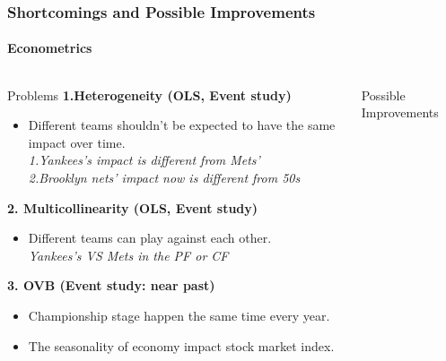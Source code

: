 \documentclass[]{beamer}
\begin{document}
\begin{frame}
        \frametitle{Shortcomings and Possible Improvements }
        \framesubtitle{Econometrics}
        \begin{columns}
            \begin{block}{\small{Problems}}
                \small \textbf{\alert{1.}Heterogeneity \tiny{(OLS, Event study)}} \vskip -0.1cm 
                    \begin{itemize}
                     \scriptsize
                    \item Different teams shouldn't be expected to have the same impact over time.\\ \vskip 0.03cm
                    \tiny{\textit{1.Yankees's impact is different from Mets'\\ \vskip 0.03cm
                                  2.Brooklyn nets' impact now is different from 50s}}
                    \end{itemize}
                    
                \small \textbf{\alert{2.} Multicollinearity \tiny{(OLS, Event study)}}\vskip -0.1cm 
                    \begin{itemize}
                     \scriptsize
                    \item Different teams can play against each other.\\ \vskip 0.03cm
                    \tiny{\textit{Yankees's VS Mets in the PF or CF}}
                    \end{itemize}

                \small \textbf{\alert{3}. OVB \tiny{(Event study: near past)}} \vskip -0.1cm 
                    \begin{itemize}
                     \scriptsize
                    \item Championship stage happen the same time every year.     \vskip -0.3cm  
                    \item The seasonality of economy impact stock market index.
                    \end{itemize}

            \end{block}

 
      \vskip 0.5cm
      \big\Rightarrow

      
        \begin{block}{\small{Possible Improvements}}
        

\end{block}
\end{columns}
\end{frame}
\end{document}
